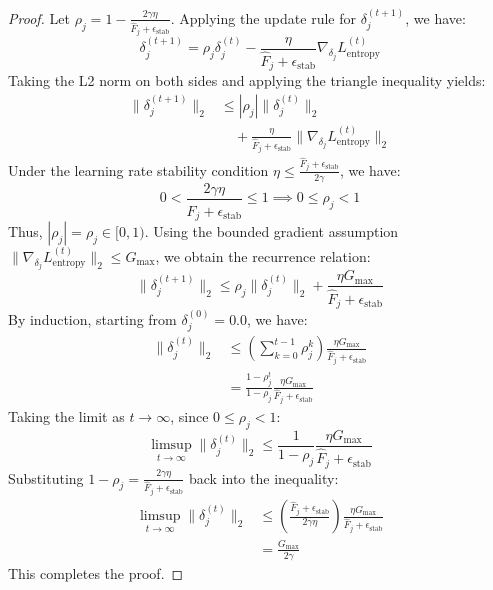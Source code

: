 \documentclass{article}
\theoremstyle{plain}
\theoremstyle{definition}
\theoremstyle{remark}
\begin{document}
\begin{proof}
Let $\rho_j = 1 - \frac{2\gamma\eta}{\hat{F}_j + \epsilon_{\text{stab}}}$. Applying the update rule for $\delta_j^{(t+1)}$, we have:
\begin{equation*}
    \delta_j^{(t+1)} = \rho_j \delta_j^{(t)} - \frac{\eta}{\hat{F}_j + \epsilon_{\text{stab}}} \nabla_{\delta_j} L_{\text{entropy}}^{(t)}
\end{equation*}
Taking the L2 norm on both sides and applying the triangle inequality yields:
\begin{align*}
    \|\delta_j^{(t+1)}\|_2 &\le |\rho_j| \|\delta_j^{(t)}\|_2 \\
    &\quad + \frac{\eta}{\hat{F}_j + \epsilon_{\text{stab}}} \|\nabla_{\delta_j} L_{\text{entropy}}^{(t)}\|_2
\end{align*}
Under the learning rate stability condition $\eta \le \frac{\hat{F}_j + \epsilon_{\text{stab}}}{2\gamma}$, we have:
\begin{equation*}
    0 < \frac{2\gamma\eta}{\hat{F}_j + \epsilon_{\text{stab}}} \le 1 \implies 0 \le \rho_j < 1
\end{equation*}
Thus, $|\rho_j| = \rho_j \in [0, 1)$. Using the bounded gradient assumption $\|\nabla_{\delta_j} L_{\text{entropy}}^{(t)}\|_2 \le G_{\max}$, we obtain the recurrence relation:
\begin{equation*}
    \|\delta_j^{(t+1)}\|_2 \le \rho_j \|\delta_j^{(t)}\|_2 + \frac{\eta G_{\max}}{\hat{F}_j + \epsilon_{\text{stab}}}
\end{equation*}
By induction, starting from $\delta_j^{(0)} = 0.0$, we have:
\begin{align*}
    \|\delta_j^{(t)}\|_2 &\le \left( \sum_{k=0}^{t-1} \rho_j^k \right) \frac{\eta G_{\max}}{\hat{F}_j + \epsilon_{\text{stab}}} \\
    &= \frac{1 - \rho_j^t}{1 - \rho_j} \frac{\eta G_{\max}}{\hat{F}_j + \epsilon_{\text{stab}}}
\end{align*}
Taking the limit as $t \to \infty$, since $0 \le \rho_j < 1$:
\begin{equation*}
    \limsup_{t \to \infty} \|\delta_j^{(t)}\|_2 \le \frac{1}{1 - \rho_j} \frac{\eta G_{\max}}{\hat{F}_j + \epsilon_{\text{stab}}}
\end{equation*}
Substituting $1 - \rho_j = \frac{2\gamma\eta}{\hat{F}_j + \epsilon_{\text{stab}}}$ back into the inequality:
\begin{align*}
    \limsup_{t \to \infty} \|\delta_j^{(t)}\|_2 &\le \left( \frac{\hat{F}_j + \epsilon_{\text{stab}}}{2\gamma\eta} \right) \frac{\eta G_{\max}}{\hat{F}_j + \epsilon_{\text{stab}}} \\
    &= \frac{G_{\max}}{2\gamma}
\end{align*}
This completes the proof.
\end{proof}
\end{document}

